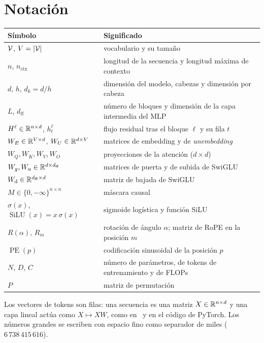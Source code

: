 \documentclass[11pt,a4paper,twoside,openany]{book}
\newcommand{\SiLU}{\operatorname{SiLU}}
\newcommand{\PE}{\operatorname{PE}}
\newcommand{\dff}{d_{\mathrm{ff}}}
\newcommand{\nctx}{n_{\mathrm{ctx}}}
\newcommand{\Wdown}{W_{\mathrm{d}}}
\begin{document}
\section*{Notación}
\begin{center}
\begin{tabular}{@{}ll@{}}
\toprule
Símbolo & Significado \\
\midrule
$\mathcal{V}$, $V=\lvert\mathcal{V}\rvert$ & vocabulario y su tamaño \\
$n$, $\nctx$ & longitud de la secuencia y longitud máxima de contexto \\
$d$, $h$, $d_k=d/h$ & dimensión del modelo, cabezas y dimensión por cabeza \\
$L$, $\dff$ & número de bloques y dimensión de la capa intermedia del MLP \\
$H^{\ell}\in\mathbb{R}^{n\times d}$, $h^{\ell}_t$ & flujo residual tras el bloque $\ell$ y su fila $t$ \\
$W_E\in\mathbb{R}^{V\times d}$, $W_U\in\mathbb{R}^{d\times V}$ & matrices de embedding y de \emph{unembedding} \\
$W_Q,W_K,W_V,W_O$ & proyecciones de la atención ($d\times d$) \\
$W_g,W_u\in\R^{d\times\dff}$ & matrices de puerta y de subida de SwiGLU \\
$\Wdown\in\R^{\dff\times d}$ & matriz de bajada de SwiGLU \\
$M\in\{0,-\infty\}^{n\times n}$ & máscara causal \\
$\sigma(x)$, $\SiLU(x)=x\,\sigma(x)$ & sigmoide logística y función SiLU \\
$R(\alpha)$, $R_m$ & rotación de ángulo $\alpha$; matriz de RoPE en la posición $m$ \\
$\PE(p)$ & codificación sinusoidal de la posición $p$ \\
$N$, $D$, $C$ & número de parámetros, de tokens de entrenamiento y de FLOPs \\
$P$ & matriz de permutación \\
\bottomrule
\end{tabular}
\end{center}

Los vectores de tokens son filas: una secuencia es una matriz $X\in\mathbb{R}^{n\times d}$ y una capa lineal actúa como $X\mapsto XW$, como en~\cite{jm3} y en el código de PyTorch. Los números grandes se escriben con espacio fino como separador de miles ($6\,738\,415\,616$).

\tableofcontents

\mainmatter







\appendix


\backmatter

\end{document}
